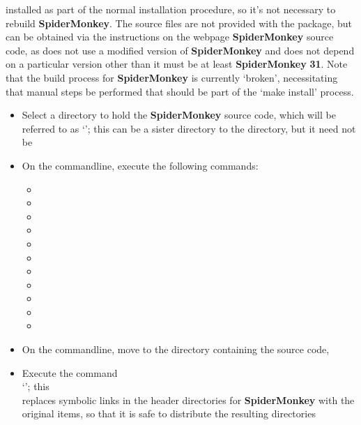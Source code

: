 installed as part of the normal \mplusm{} installation procedure, so it's not necessary to
rebuild \textbf{SpiderMonkey}.
The source files are not provided with the  package, but can be obtained
via the instructions on the web\longDash{}page
%
{\textbf{SpiderMonkey} source code}, as \mplusm{} does not use a modified version of
\textbf{SpiderMonkey} and does not depend on a particular version \longDash{} other than
it must be at least \textbf{SpiderMonkey} \textbf{31}.
Note that the build process for \textbf{SpiderMonkey} is currently `broken', necessitating
that manual steps be performed that should be part of the `make install' process.
\begin{itemize}
\item Select a directory to hold the \textbf{SpiderMonkey} source code, which will be
referred to as `'; this can be a sister directory to the
 directory, but it need not be
\item\exSp{} On the command\longDash{}line, execute the following commands:
\begin{itemize}
\item{}
\item\exSp{}
\item\exSp{}
\item\exSp{}
\item\exSp{}
\item\exSp{}
\item\exSp{}
\item\exSp{}
\item\exSp{}
\item\exSp{}
\item\exSp{}
\end{itemize}
\item\exSp{} On the command\longDash{}line, move to the directory containing the \mplusm{}
source code, 
\item\exSp{} Execute the command\\
`';
this\\
replaces symbolic links in the header directories for \textbf{SpiderMonkey} with the
original items, so that it is safe to distribute the resulting directories
\end{itemize}
